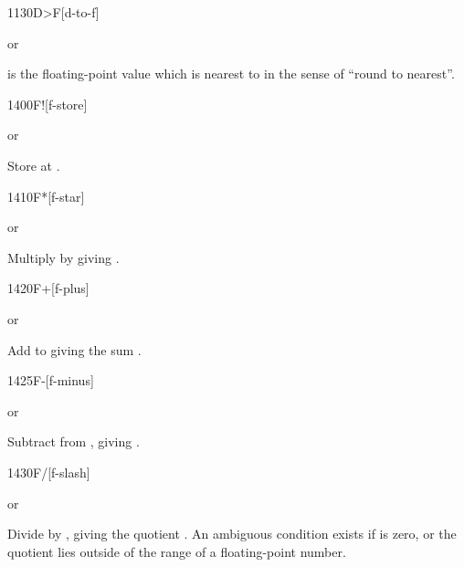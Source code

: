 \vspace*{-1ex}\enlargethispage{8ex}
\begin{worddef}[DtoF]{1130}{D>F}[d-to-f]
\item {}  or

	 is the floating-point value which is nearest to  in
	the sense of ``round to nearest''.
	
\end{worddef}

\vspace*{-1ex}
\begin{worddef}{1400}{F!}[f-store]
\item {}  or

	Store  at .
\end{worddef}

\vspace*{-1ex}
\begin{worddef}{1410}{F*}[f-star]
\item {} or

	Multiply  by  giving .
\end{worddef}

\vspace*{-1ex}
\begin{worddef}{1420}{F+}[f-plus]
\item {} or

	Add  to  giving the sum .
\end{worddef}


\begin{worddef}{1425}{F-}[f-minus]
\item {} or

	Subtract  from , giving .
\end{worddef}


\begin{worddef}{1430}{F/}[f-slash]
\item {} or

	Divide  by , giving the quotient
	. An ambiguous condition exists if  is
	zero, or the quotient lies outside 	of the range of a
	floating-point number.
\end{worddef}


